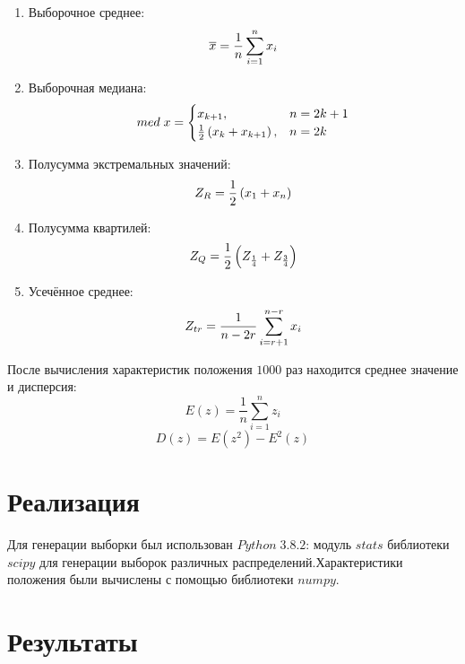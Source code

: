 \documentclass[a4]{article}
\begin{document}
\begin{enumerate}
\item Выборочное среднее:
\begin{equation}\label{eqn:average}
\overline{x} = \frac{1}{n}\sum_{i=1}^n x_i \hfill  
\end{equation}
\item Выборочная медиана:
\begin{equation}
med\; x = \begin{cases}
x_{k+1}, & n = 2k+1\\
\frac{1}{2}\left(x_k+x_{k+1}\right), & n = 2k
\end{cases} \hfill  \label{eqn:med}
\end{equation}
\item Полусумма экстремальных значений:
\begin{equation}
Z_R = \frac{1}{2}\left(x_1+x_n\right) \hfill  \label{eqn:mean_extr}
\end{equation}
\item Полусумма квартилей:
\begin{equation}
Z_Q = \frac{1}{2}\left(Z_{\frac{1}{4}}+Z_{\frac{3}{4}}\right) \hfill  \label{eqn:quartiles}
\end{equation}
\item Усечённое среднее:
\begin{equation}
Z_{tr} = \frac{1}{n - 2r}\sum_{i=r+1}^{n-r} x_i \hfill  \label{eqn:cut_mean}
\end{equation}
\end{enumerate}
\vspace{2mm}
После вычисления характеристик положения $1000$ раз находится среднее значение и дисперсия: 
\begin{equation}
E(z) = \frac{1}{n}\sum_{i=1}^n z_i
\end{equation} 
\begin{equation}
D(z) = E\left(z^2\right) - E^2(z)
\end{equation}

\section{Реализация}
Для генерации выборки был использован $Python\;3.8.2$: модуль $stats$ библиотеки $scipy$ для генерации выборок различных распределений.Характеристики положения были вычислены с помощью библиотеки $numpy$.

\newpage
\section{Результаты}
\end{document}
